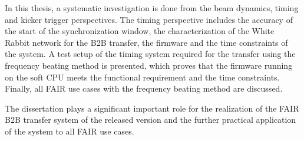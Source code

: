 
 
In this thesis, a systematic investigation is done from the beam dynamics, timing and kicker trigger perspectives. The timing perspective includes the accuracy of the start of the synchronization window, the characterization of the White Rabbit network for the B2B transfer, the firmware and the time constraints of the system. A test setup of the timing system required for the transfer using the frequency beating method is presented, which proves that the firmware running on the soft CPU meets the functional requirement and the time constraints. Finally, all FAIR use cases with the frequency beating method are discussed.

The dissertation plays a significant important role for the realization of the FAIR B2B transfer system of the released version and the further practical application of the system to all FAIR use cases.  



